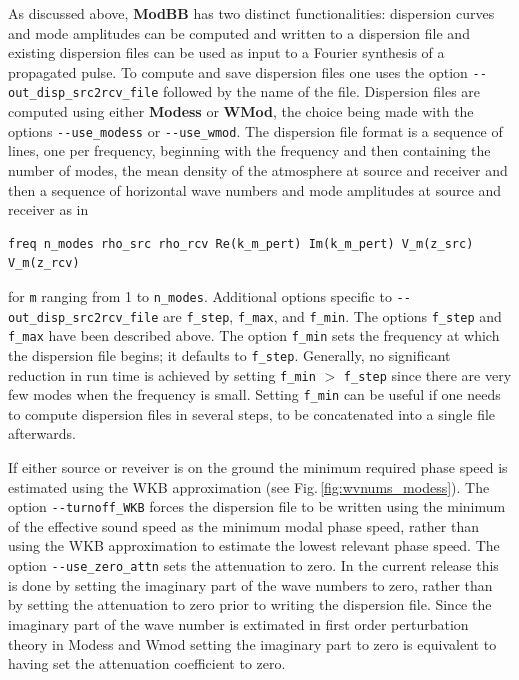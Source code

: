 As discussed above, {\bf ModBB} has two distinct functionalities: dispersion curves and mode amplitudes can be computed and written to a dispersion file and existing dispersion files can be used as input to a Fourier synthesis of a propagated pulse. To compute and save dispersion files one uses the option \verb+--out_disp_src2rcv_file+ followed by the name of the file. Dispersion files are computed using either {\bf Modess} or {\bf WMod}, the choice being made with the options \verb+--use_modess+ or \verb+--use_wmod+. The dispersion file format is a sequence of lines, one per frequency, beginning with the frequency and then containing the number of modes, the mean density of the atmosphere at source and receiver and then a sequence of horizontal wave numbers and mode amplitudes at source and receiver as in
\begin{verbatim}
freq n_modes rho_src rho_rcv Re(k_m_pert) Im(k_m_pert) V_m(z_src) V_m(z_rcv)
\end{verbatim} 
for \verb+m+ ranging from 1 to \verb+n_modes+. Additional options specific to \verb+--out_disp_src2rcv_file+ are \verb+f_step+, \verb+f_max+, and \verb+f_min+. The options \verb+f_step+ and \verb+f_max+ have been described above. The option \verb+f_min+ sets the frequency at which the dispersion file begins; it defaults to \verb+f_step+. Generally, no significant reduction in run time is achieved by setting \verb+f_min+ $>$ \verb+f_step+ since there are very few modes when the frequency is small. Setting \verb+f_min+ can be useful if one needs to compute dispersion files in several steps, to be concatenated into a single file afterwards. 

If either source or reveiver is on the ground the minimum required phase speed is estimated using the WKB approximation (see Fig.\,\ref{fig:wvnums_modess}). The option \verb+--turnoff_WKB+ forces the dispersion file to be written using the minimum of the effective sound speed as the minimum modal phase speed, rather than using the WKB approximation to estimate the lowest relevant phase speed. The option \verb+--use_zero_attn+ sets the attenuation to zero. In the current release this is done by setting the imaginary part of the wave numbers to zero, rather than by setting the attenuation to zero prior to writing the dispersion file. Since the imaginary part of the wave number is extimated in first order perturbation theory in Modess and Wmod setting the imaginary part to zero is equivalent to having set the attenuation coefficient to zero. 


